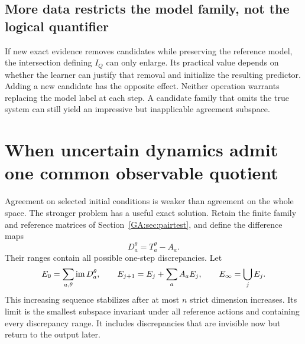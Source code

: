 \subsection{More data restricts the model family, not the logical quantifier}
If new exact evidence removes candidates while preserving the reference model, the intersection defining $I_Q$ can only enlarge. Its practical value depends on whether the learner can justify that removal and initialize the resulting predictor. Adding a new candidate has the opposite effect. Neither operation warrants replacing the model label at each step. A candidate family that omits the true system can still yield an impressive but inapplicable agreement subspace.

\section{When uncertain dynamics admit one common observable quotient}\label{GA:sec:commonquotient}
Agreement on selected initial conditions is weaker than agreement on the whole space. The stronger problem has a useful exact solution. Retain the finite family and reference matrices of Section~\ref{GA:sec:pairtest}, and define the difference maps
\[
D_a^\theta=T_a^\theta-A_a.
\]
Their ranges contain all possible one-step discrepancies. Let
\[
E_0=\sum_{a,\theta}\operatorname{im} D_a^\theta,\qquad
E_{j+1}=E_j+\sum_a A_aE_j,\qquad E_\infty=\bigcup_jE_j.
\]
This increasing sequence stabilizes after at most $n$ strict dimension increases. Its limit is the smallest subspace invariant under all reference actions and containing every discrepancy range. It includes discrepancies that are invisible now but return to the output later.


